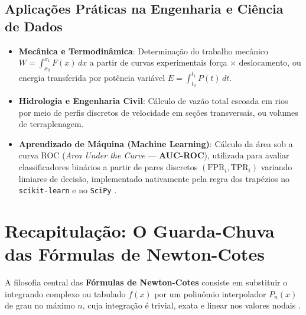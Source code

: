 \documentclass[11pt,a4paper]{article}
\begin{document}
\subsection{Aplicações Práticas na Engenharia e Ciência de Dados}
\begin{itemize}[leftmargin=1.5em]
    \item \textbf{Mecânica e Termodinâmica}: Determinação do trabalho mecânico $W = \int_{x_0}^{x_1} F(x)\,dx$ a partir de curvas experimentais força $\times$ deslocamento, ou energia transferida por potência variável $E = \int_{t_0}^{t_1} P(t)\,dt$.
    \item \textbf{Hidrologia e Engenharia Civil}: Cálculo de vazão total escoada em rios por meio de perfis discretos de velocidade em seções transversais, ou volumes de terraplenagem.
    \item \textbf{Aprendizado de Máquina (Machine Learning)}: Cálculo da área sob a curva ROC (\emph{Area Under the Curve} --- \textbf{AUC-ROC}), utilizada para avaliar classificadores binários a partir de pares discretos $(\text{FPR}_i, \text{TPR}_i)$ variando limiares de decisão, implementado nativamente pela regra dos trapézios no \texttt{scikit-learn} e no \texttt{SciPy} \cite{scipy_trapezoid, chapra2016}.
\end{itemize}

\section{Recapitulação: O Guarda-Chuva das Fórmulas de Newton-Cotes}

A filosofia central das \textbf{Fórmulas de Newton-Cotes} consiste em substituir o integrando complexo ou tabulado $f(x)$ por um polinômio interpolador $P_n(x)$ de grau no máximo $n$, cuja integração é trivial, exata e linear nos valores nodais \cite{santos2010, claudio1994, mesquita2026}.
\end{document}

